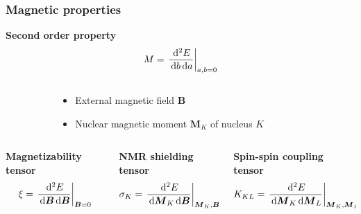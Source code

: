 \begin{frame}
\frametitle{Magnetic properties}

\centering
\textbf{Second order property}
\begin{equation}
    \nonumber
    M = \left. \frac{\,\mathrm{d}^2 E}{\,\mathrm{d} b \,\mathrm{d} a}\right|_{a,b=0}
\end{equation}

\vspace{8mm}

\begin{columns}
\begin{column}[b]{0.2\linewidth}
\end{column}

\begin{column}[b]{0.6\linewidth}
\begin{itemize}
    \item External magnetic field $\boldsymbol{B}$
    \item Nuclear magnetic moment $\boldsymbol{M}_K$ of nucleus $K$
\end{itemize}
\end{column}

\begin{column}[b]{0.2\linewidth}
\end{column}
\end{columns}

\vspace{13mm}

\begin{columns}
\begin{column}[b]{0.3\linewidth}
    \centering
    \textbf{Magnetizability tensor}
    \begin{equation}
        \nonumber
        \xi = \left. \frac{\,\mathrm{d}^2 E}{\,\mathrm{d} \boldsymbol{B} \,\mathrm{d} \boldsymbol{B}}\right|_{\boldsymbol{B}=0}
    \end{equation}
\end{column}

\begin{column}[b]{0.4\linewidth}
    \centering
    \textbf{NMR shielding tensor}
    \begin{equation}
        \nonumber
        \sigma_K = \left. \frac{\,\mathrm{d}^2 E}{\,\mathrm{d} \boldsymbol{M}_K \,\mathrm{d}
        \boldsymbol{B}}\right|_{\boldsymbol{M}_K,\boldsymbol{B}=0}
    \end{equation}
\end{column}

\begin{column}[b]{0.4\linewidth}
    \centering
    \textbf{Spin-spin coupling tensor}
    \begin{equation}
        \nonumber
        K_{KL} = \left. \frac{\,\mathrm{d}^2 E}{\,\mathrm{d} \boldsymbol{M}_K\,\mathrm{d}
        \boldsymbol{M}_L}\right|_{\boldsymbol{M}_K,\boldsymbol{M}_L=0}
    \end{equation}
\end{column}
\end{columns}

\end{frame}


